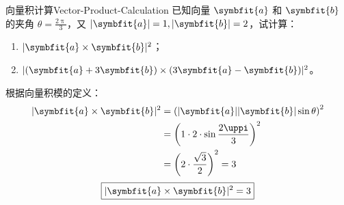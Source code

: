 \begin{problem}{向量积计算}{Vector-Product-Calculation}
    已知向量 $\symbfit{a}$ 和 $\symbfit{b}$ 的夹角 $\theta = \frac{2\uppi}{3}$，又 $|\symbfit{a}| = 1, |\symbfit{b}| = 2$，试计算：
    \begin{enumerate}
        \item $|\symbfit{a} \times \symbfit{b}|^2$；
        \item $|(\symbfit{a} + 3\symbfit{b}) \times (3\symbfit{a} - \symbfit{b})|^2$。
    \end{enumerate}
\end{problem}

\begin{solution}

    根据向量积模的定义：
    \begin{equation}
        \begin{aligned}
            |\symbfit{a} \times \symbfit{b}|^2 & = \left( |\symbfit{a}| |\symbfit{b}| \sin \theta \right)^2 \\
                                               & = \left( 1 \cdot 2 \cdot \sin \frac{2\uppi}{3} \right)^2   \\
                                               & = \left( 2 \cdot \frac{\sqrt{3}}{2} \right)^2 = 3
        \end{aligned}
    \end{equation}
    \begin{equation}
        \boxed{|\symbfit{a} \times \symbfit{b}|^2 = 3}
    \end{equation}



\end{solution}
